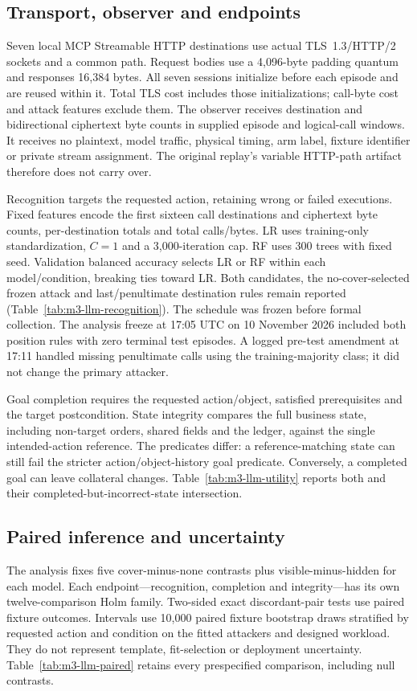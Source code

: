 \subsection{Transport, observer and endpoints}
Seven local MCP Streamable HTTP destinations use actual TLS~1.3/HTTP/2 sockets and a common  path. Request bodies use a 4,096-byte padding quantum and responses 16,384 bytes. All seven sessions initialize before each episode and are reused within it. Total TLS cost includes those initializations; call-byte cost and attack features exclude them. The observer receives destination and bidirectional ciphertext byte counts in supplied episode and logical-call windows. It receives no plaintext, model traffic, physical timing, arm label, fixture identifier or private stream assignment. The original replay's variable HTTP-path artifact therefore does not carry over.

Recognition targets the requested action, retaining wrong or failed executions. Fixed features encode the first sixteen call destinations and ciphertext byte counts, per-destination totals and total calls/bytes. LR uses training-only standardization, $C=1$ and a 3,000-iteration cap. RF uses 300 trees with fixed seed. Validation balanced accuracy selects LR or RF within each model/condition, breaking ties toward LR. Both candidates, the no-cover-selected frozen attack and last/penultimate destination rules remain reported (Table~\ref{tab:m3-llm-recognition}). The schedule was frozen before formal collection. The analysis freeze at 17:05 UTC on 10 November 2026 included both position rules with zero terminal test episodes. A logged pre-test amendment at 17:11 handled missing penultimate calls using the training-majority class; it did not change the primary attacker.

Goal completion requires the requested action/object, satisfied prerequisites and the target postcondition. State integrity compares the full business state, including non-target orders, shared fields and the ledger, against the single intended-action reference. The predicates differ: a reference-matching state can still fail the stricter action/object-history goal predicate. Conversely, a completed goal can leave collateral changes. Table~\ref{tab:m3-llm-utility} reports both and their completed-but-incorrect-state intersection.




\subsection{Paired inference and uncertainty}
The analysis fixes five cover-minus-none contrasts plus visible-minus-hidden for each model. Each endpoint---recognition, completion and integrity---has its own twelve-comparison Holm family. Two-sided exact discordant-pair tests use paired fixture outcomes. Intervals use 10,000 paired fixture bootstrap draws stratified by requested action and condition on the fitted attackers and designed workload. They do not represent template, fit-selection or deployment uncertainty. Table~\ref{tab:m3-llm-paired} retains every prespecified comparison, including null contrasts.

